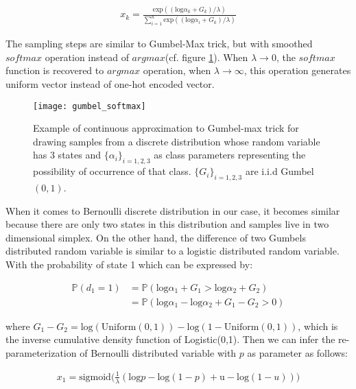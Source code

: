\begin{equation} \label{gumbel_softmax}
\begin{aligned}
x_{k} = \frac{\text{exp}((\text{log}\alpha_k + G_k)/\lambda)}{\sum_{i=1}^{n}\text{exp}((\text{log}\alpha_i + G_k)/\lambda)}
\end{aligned}
\end{equation}

The sampling steps are similar to Gumbel-Max trick, but with smoothed $softmax$ operation instead of $argmax$(cf. figure \ref{fig:gumbel_softmax}). When $\lambda \rightarrow 0$, the $softmax$ function is recovered to $argmax$ operation, when $\lambda \rightarrow \infty$, this operation generates uniform vector instead of one-hot encoded vector.

\begin{figure}[h!]
	\begin{center}
		\texttt{[image: gumbel\_softmax]}
		\caption{Example of continuous approximation to Gumbel-max trick for drawing samples from a discrete distribution whose random variable has 3 states and $\{\alpha_{i}\}_{i=1,2,3}$ as class parameters representing the possibility of occurrence of that class. $\{G_{i}\}_{i=1,2,3}$ are i.i.d Gumbel$(0,1)$\cite{maddison2016concrete}.}		
		\label{fig:gumbel_softmax}
	\end{center}
\end{figure}

When it comes to Bernoulli discrete distribution in our case, it becomes similar because there are only two states in this distribution and samples live in two dimensional simplex. On the other hand, the difference of two Gumbels distributed random variable is similar to a logistic distributed random variable.  With the probability of state 1 which can be expressed by:

\[
\begin{aligned}
\mathbb P(d_1 = 1) &= \mathbb P(\text{log} \alpha_1 + G_1 >\text{log} \alpha_2 + G_2)\\
&=\mathbb P(\text{log} \alpha_1 - \text{log} \alpha_2 + G_1 - G_2 > 0)
\end{aligned}
\] 

where $G_1 - G_2 = \text{log}(\text{Uniform}(0,1)) - \text{log}(1-\text{Uniform}(0,1))$, which is the inverse cumulative density function of Logistic(0,1).
Then we can infer the re-parameterization of Bernoulli distributed variable with $p$ as parameter as follows:

\begin{equation}\label{bern_repa}
	\begin{aligned}
	x_1 = \text{sigmoid}\big(
	\frac{1}{\lambda} (\text{log}p - \text{log}(1-p) + \text{u} - \text{log}(1-u)) 
	\big)
	\end{aligned}
\end{equation}

